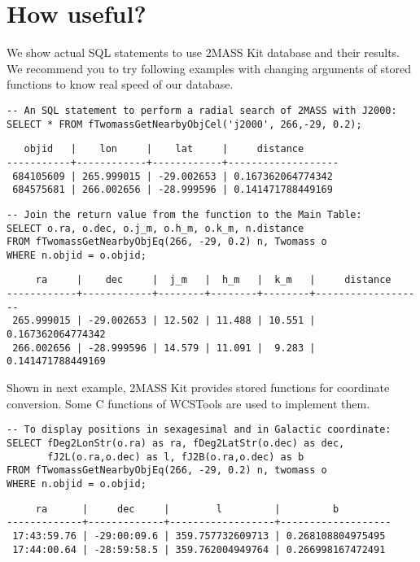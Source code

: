 \documentclass[11pt,twoside]{article}
\begin{document}
\section{How useful?}

We show actual SQL statements to use 2MASS Kit database
and their results.
We recommend you to try following examples with changing 
arguments of stored functions to know real speed of our
database.

\begin{verbatim}
-- An SQL statement to perform a radial search of 2MASS with J2000:
SELECT * FROM fTwomassGetNearbyObjCel('j2000', 266,-29, 0.2);
\end{verbatim}

{\small
\begin{verbatim}
   objid   |    lon     |    lat     |     distance      
-----------+------------+------------+-------------------
 684105609 | 265.999015 | -29.002653 | 0.167362064774342
 684575681 | 266.002656 | -28.999596 | 0.141471788449169
\end{verbatim}
}

\begin{verbatim}
-- Join the return value from the function to the Main Table:
SELECT o.ra, o.dec, o.j_m, o.h_m, o.k_m, n.distance
FROM fTwomassGetNearbyObjEq(266, -29, 0.2) n, Twomass o
WHERE n.objid = o.objid;
\end{verbatim}

{\small
\begin{verbatim}
     ra     |    dec     |  j_m   |  h_m   |  k_m   |     distance     
------------+------------+--------+--------+--------+-------------------
 265.999015 | -29.002653 | 12.502 | 11.488 | 10.551 | 0.167362064774342
 266.002656 | -28.999596 | 14.579 | 11.091 |  9.283 | 0.141471788449169
\end{verbatim}
}

Shown in next example,
2MASS Kit provides stored functions for coordinate conversion.
Some C functions of WCSTools \citep{min_2006}
are used to implement them.

\begin{verbatim}
-- To display positions in sexagesimal and in Galactic coordinate:
SELECT fDeg2LonStr(o.ra) as ra, fDeg2LatStr(o.dec) as dec, 
       fJ2L(o.ra,o.dec) as l, fJ2B(o.ra,o.dec) as b
FROM fTwomassGetNearbyObjEq(266, -29, 0.2) n, twomass o
WHERE n.objid = o.objid;
\end{verbatim}

{\small
\begin{verbatim}
     ra      |     dec     |        l         |         b         
-------------+-------------+------------------+-------------------
 17:43:59.76 | -29:00:09.6 | 359.757732609713 | 0.268108804975495
 17:44:00.64 | -28:59:58.5 | 359.762004949764 | 0.266998167472491
\end{verbatim}
}
\end{document}
